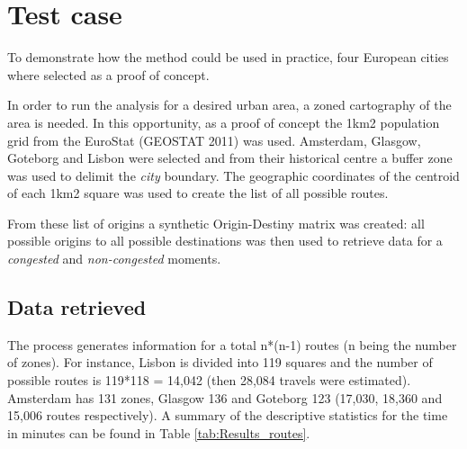 \documentclass[a4paper]{jpconf}
\begin{document}
	\section{Test case} %
	To demonstrate how the method could be used in practice, four European cities where selected as a proof of concept.\par
	
	In order to run the analysis for a desired urban area, a zoned cartography of the area is needed. In this opportunity, as a proof of concept the 1km2 population grid from the EuroStat (GEOSTAT 2011) was used. Amsterdam, Glasgow, Goteborg and Lisbon were selected and from their historical centre a buffer zone was used to delimit the \textit{city} boundary. The geographic coordinates of the centroid of each 1km2 square was used to create the list of all possible routes. \par
	From these list of origins a synthetic Origin-Destiny matrix was created: all possible origins to all possible destinations was then used to retrieve data for a \textit{congested} and \textit{non-congested} moments. 
	
	\subsection{Data retrieved} %
	The process generates information for a total n*(n-1) routes (n being the number of zones). For instance, Lisbon is divided into 119 squares and the number of possible routes is 119*118 = 14,042 (then 28,084 travels were estimated). Amsterdam has 131 zones, Glasgow 136 and Goteborg 123 (17,030, 18,360 and 15,006 routes respectively). A summary of the descriptive statistics for the time in minutes can be found in Table \ref{tab:Results_routes}.
	
\end{document}

